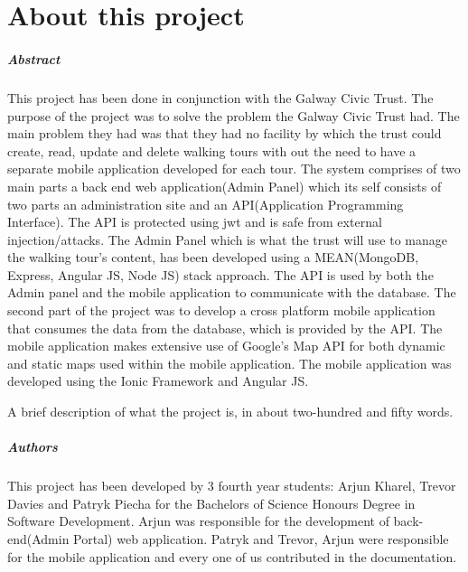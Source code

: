 
\chapter*{About this project}
\paragraph{Abstract}
This project has been done in conjunction with the Galway Civic Trust. The purpose of the project was to solve the problem the Galway Civic Trust had. The main problem they had was that they had no facility by which the trust could create, read, update and delete walking tours with out the need to have a separate mobile application developed for each tour. 
The system comprises of two main parts a back end web application(Admin Panel) which its self consists of two parts an administration site and an API(Application Programming Interface). The API is protected using jwt and is safe from external injection/attacks. The Admin Panel which is what the trust will use to manage the walking tour's content, has been developed using a MEAN(MongoDB, Express, Angular JS, Node JS) stack approach. The API is used by both the Admin panel and the mobile application to communicate with the database. The second part of the project was to develop a cross platform mobile application that consumes the data from the database, which is provided by the API. The mobile application makes extensive use of Google's Map API for both dynamic and static maps used within the mobile application. The mobile application was developed using the Ionic Framework and Angular JS. 


A brief description of what the project is, in about two-hundred and fifty words.

\paragraph{Authors}
This project has been developed by 3 fourth year students: Arjun Kharel, Trevor Davies and Patryk Piecha for the Bachelors of Science Honours Degree in Software Development.
Arjun was responsible for the development of  back-end(Admin Portal) web application.
Patryk and Trevor, Arjun were responsible for the mobile application and every one of us contributed in the documentation. 

